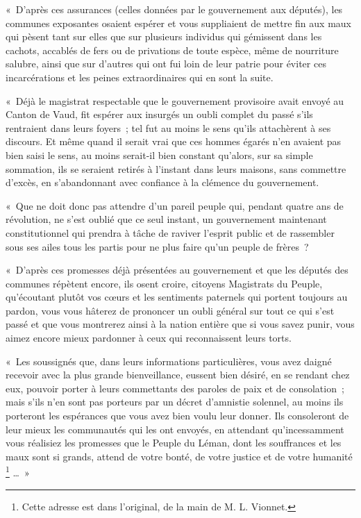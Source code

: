 \documentclass[french,twoside]{book} %
\newenvironment{quoteblock}%
  {\begin{quoting}}
  {\end{quoting}}
\newenvironment{quotebar}{%
    \def\FrameCommand{{\color{rubric!10!}\vrule width 0.5em} \hspace{0.9em}}%
    \def\OuterFrameSep{\itemsep} %
    \MakeFramed {\advance\hsize-\width \FrameRestore}
  }%
  {%
    \endMakeFramed
  }
\renewenvironment{quoteblock}%
  {%
    \savenotes
    \setstretch{0.9}
    \normalfont
    \begin{quotebar}
  }
  {%
    \end{quotebar}
    \spewnotes
  }
\begin{document}
\begin{quoteblock}
 \noindent « D’après ces assurances (celles données par le gouvernement aux députés), les communes exposantes osaient espérer et vous suppliaient de mettre fin aux maux qui pèsent tant sur elles que sur plusieurs individus qui gémissent dans les cachots, accablés de fers ou de privations de toute espèce, même de nourriture salubre, ainsi que sur d’autres qui ont fui loin de leur patrie pour éviter ces incarcérations et les peines extraordinaires qui en sont la suite.\par
 « Déjà le magistrat respectable que le gouvernement provisoire avait envoyé au Canton de Vaud, fit espérer aux insurgés un oubli complet du passé s’ils rentraient dans leurs foyers ; tel fut au moins le sens qu’ils attachèrent à ses discours. Et même quand il serait vrai que ces hommes égarés n’en avaient pas bien saisi le sens, au moins serait-il bien constant qu’alors, sur sa simple sommation, ils se seraient retirés à l’instant dans leurs maisons, sans commettre d’excès, en s’abandonnant avec confiance à la clémence du gouvernement.\par
 « Que ne doit donc pas attendre d’un pareil peuple qui, pendant quatre ans de révolution, ne s’est oublié que ce seul instant, un gouvernement maintenant constitutionnel qui prendra à tâche de raviver l’esprit public et de rassembler sous ses ailes tous les partis pour ne plus faire qu’un peuple de frères ?\par
 « D’après ces promesses déjà présentées au gouvernement et que les députés des communes répètent encore, ils osent croire, citoyens Magistrats du Peuple, qu’écoutant plutôt vos cœurs et les sentiments paternels qui portent toujours au pardon, vous vous hâterez de prononcer un oubli général sur tout ce qui s’est passé et que vous montrerez ainsi à la nation entière que si vous savez punir, vous aimez encore mieux pardonner à ceux qui reconnaissent leurs torts.\par
 « Les soussignés que, dans leurs informations particulières, vous avez daigné recevoir avec la plus grande bienveillance, eussent bien désiré, en se rendant chez eux, pouvoir porter à leurs commettants des paroles de paix et de consolation ; mais s’ils n’en sont pas porteurs par un décret d’amnistie solennel, au moins ils porteront les espérances que vous avez bien voulu leur donner. Ils consoleront de leur mieux les communautés qui les ont envoyés, en attendant qu’incessamment vous réalisiez les promesses que le Peuple du Léman, dont les souffrances et les maux sont si grands, attend de votre bonté, de votre justice et de votre humanité \footnote{Cette adresse est dans l’original, de la main de M. L. Vionnet.} … »
 \end{quoteblock}
\end{document}
